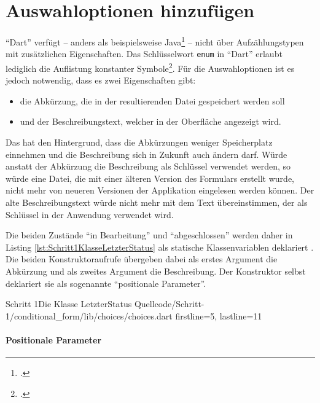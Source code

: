
\section{Auswahloptionen hinzufügen}

\enquote{Dart} verfügt -- anders als beispielsweise Java\footcite[Vgl.][S. 321]{TheJavaLanguageSpecificationJavaSE16Edition} -- nicht über Aufzählungstypen mit zusätzlichen Eigenschaften.
Das Schlüsselwort \texttt{enum} in \enquote{Dart} erlaubt lediglich die Auflistung konstanter Symbole\footcite[Vgl.][S. 74f.]{DartProgrammingLanguageSpecification5thedition}.
Für die Auswahloptionen ist es jedoch notwendig, dass es zwei Eigenschaften gibt:
\begin{itemize}
  \parsep 0pt
  \topsep 0pt
  \itemsep 0pt

  \item die Abkürzung, die in der resultierenden Datei gespeichert werden soll
  \item und der Beschreibungstext, welcher in der Oberfläche angezeigt wird.
\end{itemize}
Das hat den Hintergrund, dass die Abkürzungen weniger Speicherplatz einnehmen und die Beschreibung sich in Zukunft auch ändern darf.
Würde anstatt der Abkürzung die Beschreibung als Schlüssel verwendet werden, so würde eine Datei, die mit einer älteren Version des Formulars erstellt wurde, nicht mehr von neueren Versionen der Applikation eingelesen werden können.
Der alte Beschreibungstext würde nicht mehr mit dem Text übereinstimmen, der als Schlüssel in der Anwendung verwendet wird.


Die beiden Zustände \enquote{in Bearbeitung} und \enquote{abgeschlossen} werden daher in Listing \ref{lst:Schritt1KlasseLetzterStatus} als statische Klassenvariablen deklariert .
Die beiden Konstruktoraufrufe übergeben dabei als erstes Argument die Abkürzung und als zweites Argument die Beschreibung.
Der Konstruktor selbst  deklariert sie als sogenannte \enquote{positionale Parameter}.



\begin{alexlisting}{Schritt 1}{Die Klasse LetzterStatus}
  {Quellcode/Schritt-1/conditional_form/lib/choices/choices.dart}
  {firstline=5, lastline=11}
  \label{lst:Schritt1KlasseLetzterStatus}
\end{alexlisting}



\paragraph{Positionale Parameter}


